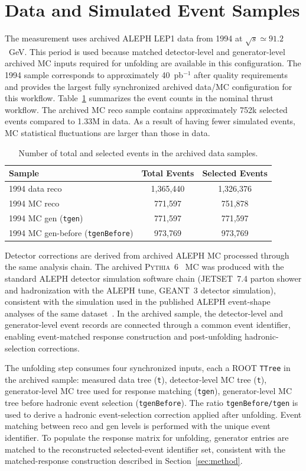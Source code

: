 \section{Data and Simulated Event Samples}
\label{sec:datasets}

The measurement uses archived ALEPH LEP1 data from 1994 at $\sqrt{s}\simeq 91.2$~GeV. This period is used because matched detector-level and generator-level archived MC inputs required for unfolding are available in this configuration. The 1994 sample corresponds to approximately 40~pb$^{-1}$ after quality requirements and provides the largest fully synchronized archived data/MC configuration for this workflow. Table~\ref{tab:sample_bookkeeping} summarizes the event counts in the nominal thrust workflow. The archived MC reco sample contains approximately 752k selected events compared to 1.33M in data. As a result of having fewer simulated events, MC statistical fluctuations are larger than those in data.

\begin{table}[ht!]
\centering
\begin{tabular}{l c c}
\hline
Sample & Total Events & Selected Events \\
\hline
1994 data reco & 1,365,440 & 1,326,376 \\
1994 MC reco & 771,597 & 751,878 \\
1994 MC gen (\texttt{tgen}) & 771,597 & 771,597 \\
1994 MC gen-before (\texttt{tgenBefore}) & 973,769 & 973,769 \\
\hline
\end{tabular}
\caption{Number of total and selected events in the archived data samples.}
\label{tab:sample_bookkeeping}
\end{table}

Detector corrections are derived from archived ALEPH MC processed through the same analysis chain. The archived \textsc{Pythia}~6~\cite{Sjostrand:2000wi} MC was produced with the standard ALEPH detector simulation software chain (\textsc{JETSET}~7.4 parton shower and hadronization with the ALEPH tune, \textsc{GEANT}~3 detector simulation), consistent with the simulation used in the published ALEPH event-shape analyses of the same dataset~\cite{Heister:2003aj}. In the archived sample, the detector-level and generator-level event records are connected through a common event identifier, enabling event-matched response construction and post-unfolding hadronic-selection corrections. 

The unfolding step consumes four synchronized inputs, each a ROOT \texttt{TTree} in the
archived sample: measured data tree (\texttt{t}), detector-level MC tree (\texttt{t}), generator-level MC tree used for response matching (\texttt{tgen}), generator-level MC tree before hadronic event selection (\texttt{tgenBefore}). The ratio \texttt{tgenBefore/tgen} is used to derive a hadronic event-selection correction applied after unfolding. Event matching between reco and gen levels is performed with the unique event identifier. To populate the response matrix for unfolding, generator entries are matched to the reconstructed selected-event identifier set, consistent with the matched-response construction described in Section~\ref{sec:method}.

